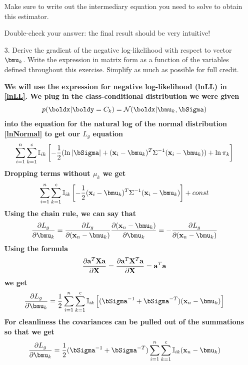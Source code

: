 \documentclass[submit]{harvardml}
\newenvironment{answer}{%
    \color{answergreen}\bf}
  {%
  }
\begin{document}
\begin{enumerate}
    Make sure to write out the intermediary equation you need to solve to obtain this estimator. 

    Double-check your answer: the final result should be very intuitive!

  \item[3.] Derive the gradient of the negative log-likelihood with respect to vector $\bmu_k$.
    Write the expression in matrix form as a function of the variables defined
    throughout this exercise. Simplify as much as possible for full credit.
    
    \begin{answer}
        We will use the expression for negative log-likelihood (lnLL) in
        \eqref{lnLL}. We plug in the class-conditional distribution we were
        given 
    $$p(\boldx | \boldy = C_k) = \mathcal{N}(\boldx |  \bmu_k, \bSigma)$$
        into the equation for the natural log of the normal distribution \eqref{lnNormal}
        to get our $L_g$ equation
        \begin{equation}
            \sum_{i=1}^n \sum_{k=1}^c \mBI \left[ 
            -\frac{1}{2} (
                \ln|\bSigma|+(\bx_i-\bmu_k)^T\Sigma^{-1} (\bx_i-\bmu_k) )
                + \ln\pi_k \right] \label{lnGaussLL}
        \end{equation}
        Dropping terms without $\mu_k$ we get 
        \begin{equation}
            \sum_{i=1}^n \sum_{k=1}^c \mBI 
            \left[ -\frac{1}{2} (\bx_i-\bmu_k)^T \Sigma^{-1} (\bx_i-\bmu_k) 
            \right] + const
        \end{equation}
        Using the chain rule, we can say that 
        $$
        \frac{\partial L_g}{\partial \bmu_k} = 
        \frac{\partial L_g}{\partial( \bx_n - \bmu_k)} 
        \frac{\partial(\bx_n - \bmu_k)}{\partial \bmu_k} 
        = - \frac{\partial L_g}{\partial( \bx_n - \bmu_k)} 
        $$
        Using the formula
        $$  \frac{\partial \mathbf{a}^T \mathbf{X} \mathbf{a}}{\partial \mathbf{X}}  
             = \frac{\partial \mathbf{a}^T \mathbf{X}^T \mathbf{a}}{\partial \mathbf{X}}  
            = \mathbf{a}^T\mathbf{a}
        $$
        we get 
        $$
        \frac{\partial L_g}{\partial \bmu_k} = \frac{1}{2} 
             \sum_{i=1}^n \sum_{k=1}^c \mBI  \left[ 
             (\bSigma^{-1} + \bSigma^{-T})
             (\bx_n - \bmu_k) \right]
        $$
        For cleanliness the covariances can be pulled out of the summations so that we get 
        \begin{equation}
        \frac{\partial L_g}{\partial \bmu_k} = \frac{1}{2} 
             (\bSigma^{-1} + \bSigma^{-T})
             \sum_{i=1}^n \sum_{k=1}^c \mBI 
             (\bx_n - \bmu_k)  \label{MLEmu}
        \end{equation}


\end{answer}
\end{enumerate}
\end{document}
